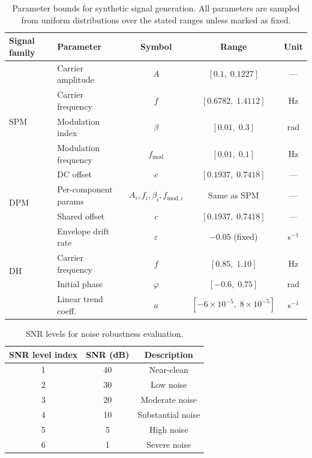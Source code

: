 \documentclass[11pt]{article}
\begin{document}
\begin{table}[ht]
\centering
\caption{Parameter bounds for synthetic signal generation. All parameters are sampled from uniform distributions over the stated ranges unless marked as fixed.}
\label{tab:bounds}
\smallskip
\begin{tabular}{@{}llccc@{}}
\toprule
\textbf{Signal family} & \textbf{Parameter} & \textbf{Symbol} & \textbf{Range} & \textbf{Unit} \\
\midrule
\multirow{5}{*}{SPM}
    & Carrier amplitude      & $A$                & $[0.1,\; 0.1227]$                       & ---   \\
    & Carrier frequency      & $f$                & $[0.6782,\; 1.4112]$                    & Hz    \\
    & Modulation index       & $\beta$            & $[0.01,\; 0.3]$                         & rad   \\
    & Modulation frequency   & $f_{\mathrm{mod}}$ & $[0.01,\; 0.1]$                         & Hz    \\
    & DC offset              & $c$                & $[0.1937,\; 0.7418]$                    & ---   \\
\midrule
\multirow{2}{*}{DPM}
    & Per-component params   & $A_i, f_i, \beta_i, f_{\mathrm{mod},i}$ & Same as SPM       & ---   \\
    & Shared offset          & $c$                & $[0.1937,\; 0.7418]$                    & ---   \\
\midrule
\multirow{4}{*}{DH}
    & Envelope drift rate    & $\varepsilon$      & $-0.05$ (fixed)                         & s$^{-1}$ \\
    & Carrier frequency      & $f$                & $[0.85,\; 1.10]$                        & Hz    \\
    & Initial phase          & $\varphi$          & $[-0.6,\; 0.75]$                        & rad   \\
    & Linear trend coeff.    & $a$                & $[-6\!\times\!10^{-5},\; 8\!\times\!10^{-5}]$ & s$^{-1}$ \\
\bottomrule
\end{tabular}
\end{table}

\begin{table}[ht]
\centering
\caption{SNR levels for noise robustness evaluation.}
\label{tab:snr}
\smallskip
\begin{tabular}{@{}ccc@{}}
\toprule
\textbf{SNR level index} & \textbf{SNR (dB)} & \textbf{Description} \\
\midrule
1 & 40 & Near-clean    \\
2 & 30 & Low noise     \\
3 & 20 & Moderate noise \\
4 & 10 & Substantial noise \\
5 & 5  & High noise    \\
6 & 1  & Severe noise  \\
\bottomrule
\end{tabular}
\end{table}
\end{document}
